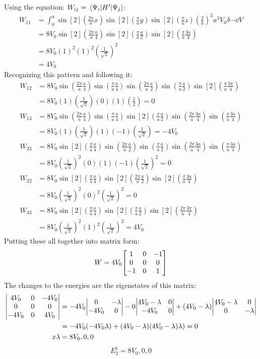 \documentclass[11pt]{article}
\begin{document}
Using the equation: $W_{ij} = \mel{\Psi_i}{H^\prime}{\Psi_j}$:
\begin{align*}
W_{11} & = \int_0^a \sin[2](\frac{2\pi}{a}x)\sin[2](\frac{\pi}{a}y)\sin[2](\frac{\pi}{a}z)\left(\frac{2}{a}\right)^3a^3 V_0 \delta \cdots \dd{V}\\
& = 8 V_0 \sin[2](\frac{2\pi}{a}\frac{a}{4})\sin[2](\frac{\pi}{a}\frac{a}{2})\sin[2](\frac{\pi}{a}\frac{3a}{4})\\
&= 8V_0 (1)^2(1)^2\left(\frac{1}{\sqrt{2}}\right)^2\\
& = 4V_0
\end{align*}
Recognizing this pattern and following it:
\begin{align*}
W_{12} & = 8V_0 \sin(\frac{2\pi}{a}\frac{a}{4})\sin(\frac{\pi}{a}\frac{a}{4})\sin(\frac{2\pi}{a}\frac{a}{2})\sin(\frac{\pi}{a}\frac{a}{2})\sin[2](\frac{\pi}{a}\frac{3\pi}{4})\\
& = 8V_0 (1)\left(\frac{1}{\sqrt{2}} \right)(0)(1) \left(\frac{1}{2}\right) = 0\\
W_{13} & = 8V_0 \sin(\frac{2\pi}{a}\frac{a}{4})\sin(\frac{\pi}{a}\frac{a}{4})\sin[2](\frac{\pi}{a}\frac{a}{2})\sin(\frac{2\pi}{a}\frac{3a}{4})\sin(\frac{\pi}{a}\frac{3a}{4})\\
& = 8V_0 (1)\left(\frac{1}{\sqrt{2}}\right)(1)(-1)\left(\frac{1}{\sqrt{2}}\right) = -4V_0\\
W_{23} &= 8V_0 \sin[2](\frac{\pi}{a}\frac{a}{4})\sin(\frac{2\pi}{a}\frac{a}{2})\sin(\frac{\pi}{a}\frac{a}{2})\sin(\frac{2\pi}{a}\frac{3a}{4})\sin(\frac{\pi}{a}\frac{3a}{4})\\
& = 8V_0 \left(\frac{1}{\sqrt{2}}\right)^2 (0)(1)(-1)\left(\frac{1}{\sqrt{2}}\right)^2 = 0\\
W_{22} &= 8V_0 \sin[2](\frac{\pi}{a}\frac{a}{4})\sin[2](\frac{2\pi}{a}\frac{a}{2})\sin[2](\frac{\pi}{a}\frac{3a}{4})\\
& = 8V_0 \left(\frac{1}{\sqrt{2}}\right)^2(0)^2\left(\frac{1}{\sqrt{2}}\right)^2 = 0\\
W_{33} & = 8V_0 \sin[2](\frac{\pi}{a}\frac{a}{4})\sin[2](\frac{\pi}{a}\frac{a}{2})\sin[2](\frac{2\pi}{a}\frac{3\pi}{4})\\
& = 8V_0 \left(\frac{1}{\sqrt{2}}\right)^2 (1)^2 \left(\frac{1}{\sqrt{2}}\right)^2 = 4V_0
\end{align*}
Putting these all together into matrix form:
\[W = 4V_0\mqty[1 & 0 & -1 \\ 0 & 0 & 0 \\ -1 & 0 & 1]\]
The changes to the energies are the eigenstates of this matrix:
\begin{align*}
\mqty|4V_0 & 0 & -4V_0 \\ 0 & 0 & 0 \\ -4V_0 & 0 & 4V_0| & = -4V_0 \mqty|0 & -\lambda \\ -4V_0 & 0| - 0 \mqty|4V_0 - \lambda & 0 \\ -4V_0 & 0| + (4V_0 -\lambda)\mqty|4V_0 -\lambda & 0 \\ 0 & -\lambda|\\
& = -4V_0(-4V_0\lambda) + (4V_0 -\lambda)(4V_0 -\lambda)\lambda) = 0\\x
\lambda & = 8V_0, 0, 0
\end{align*}
\[\boxed{E_2^1 = 8V_0, 0, 0}\]
\end{document}
